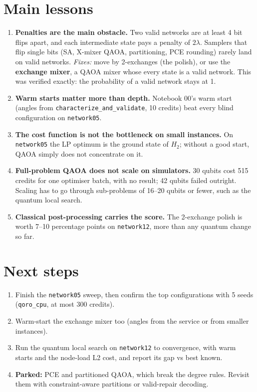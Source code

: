 \documentclass[11pt]{article}
\begin{document}
\section{Main lessons}
\begin{enumerate}
\item \textbf{Penalties are the main obstacle.} Two valid networks are at least 4 bit flips apart,
  and each intermediate state pays a penalty of $2\lambda$. Samplers that flip single bits (SA,
  X-mixer QAOA, partitioning, PCE rounding) rarely land on valid networks. \emph{Fixes:} move by
  2-exchanges (the polish), or use the \textbf{exchange mixer}, a QAOA mixer whose every state is a
  valid network. This was verified exactly: the probability of a valid network stays at 1.
\item \textbf{Warm starts matter more than depth.} Notebook 00's warm start (angles from
  \texttt{characterize\_and\_validate}, 10 credits) beat every blind configuration on \texttt{network05}.
\item \textbf{The cost function is not the bottleneck on small instances.} On \texttt{network05} the
  LP optimum is the ground state of $H_2$; without a good start, QAOA simply does not concentrate on it.
\item \textbf{Full-problem QAOA does not scale on simulators.} 30 qubits cost 515 credits for one
  optimiser batch, with no result; 42 qubits failed outright. Scaling has to go through
  sub-problems of 16--20 qubits or fewer, such as the quantum local search.
\item \textbf{Classical post-processing carries the score.} The 2-exchange polish is worth 7--10
  percentage points on \texttt{network12}, more than any quantum change so far.
\end{enumerate}

\section{Next steps}
\begin{enumerate}
\item Finish the \texttt{network05} sweep, then confirm the top configurations with 5 seeds
  (\texttt{qoro\_cpu}, at most 300 credits).
\item Warm-start the exchange mixer too (angles from the service or from smaller instances).
\item Run the quantum local search on \texttt{network12} to convergence, with warm starts and the
  node-load L2 cost, and report its gap vs best known.
\item \textbf{Parked:} PCE and partitioned QAOA, which break the degree rules. Revisit them with
  constraint-aware partitions or valid-repair decoding.
\end{enumerate}
\end{document}
